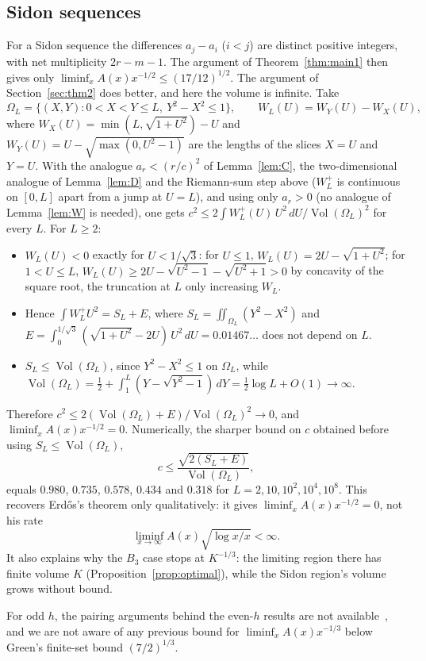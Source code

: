 \documentclass[11pt]{amsart}
\theoremstyle{remark}
\newcommand{\Vol}{\operatorname{Vol}}
\begin{document}
\subsection{Sidon sequences}
For a Sidon sequence the differences $a_j-a_i$ ($i<j$) are distinct positive integers, with net multiplicity $2r-m-1$. The argument of Theorem~\ref{thm:main1} then gives only $\liminf_xA(x)x^{-1/2}\le(17/12)^{1/2}$. The argument of Section~\ref{sec:thm2} does better, and here the volume is infinite. Take
\[
\Omega_L=\{(X,Y):0<X<Y\le L,\ Y^2-X^2\le1\},\qquad W_L(U)=W_Y(U)-W_X(U),
\]
where $W_X(U)=\min(L,\sqrt{1+U^2})-U$ and $W_Y(U)=U-\sqrt{\max(0,U^2-1)}$ are the lengths of the slices $X=U$ and $Y=U$. With the analogue $a_r<(r/c)^2$ of Lemma~\ref{lem:C}, the two-dimensional analogue of Lemma~\ref{lem:D} and the Riemann-sum step above ($W_L^+$ is continuous on $[0,L]$ apart from a jump at $U=L$), and using only $a_r>0$ (no analogue of Lemma~\ref{lem:W} is needed), one gets $c^2\le2\int W_L^+(U)\,U^2\,dU/\Vol(\Omega_L)^2$ for every $L$. For $L\ge2$:
\begin{itemize}
\item $W_L(U)<0$ exactly for $U<1/\sqrt3$: for $U\le1$, $W_L(U)=2U-\sqrt{1+U^2}$; for $1<U\le L$, $W_L(U)\ge2U-\sqrt{U^2-1}-\sqrt{U^2+1}>0$ by concavity of the square root, the truncation at $L$ only increasing $W_L$.
\item Hence $\int W_L^+U^2=S_L+E$, where $S_L=\iint_{\Omega_L}(Y^2-X^2)$ and $E=\int_0^{1/\sqrt3}(\sqrt{1+U^2}-2U)\,U^2\,dU=0.01467\ldots$ does not depend on $L$.
\item $S_L\le\Vol(\Omega_L)$, since $Y^2-X^2\le1$ on $\Omega_L$, while $\Vol(\Omega_L)=\frac12+\int_1^L(Y-\sqrt{Y^2-1})\,dY=\frac12\log L+O(1)\to\infty$.
\end{itemize}
Therefore $c^2\le2(\Vol(\Omega_L)+E)/\Vol(\Omega_L)^2\to0$, and $\liminf_xA(x)x^{-1/2}=0$. Numerically, the sharper bound on $c$ obtained before using $S_L\le\Vol(\Omega_L)$,
\[
c\le\frac{\sqrt{2(S_L+E)}}{\Vol(\Omega_L)},
\]
equals $0.980$, $0.735$, $0.578$, $0.434$ and $0.318$ for $L=2,10,10^2,10^4,10^8$. This recovers Erd\H{o}s's theorem only qualitatively: it gives $\liminf_xA(x)x^{-1/2}=0$, not his rate
\[
\liminf_{x\to\infty}A(x)\sqrt{\log x/x}<\infty.
\]
 It also explains why the $B_3$ case stops at $K^{-1/3}$: the limiting region there has finite volume $K$ (Proposition~\ref{prop:optimal}), while the Sidon region's volume grows without bound.

For odd $h$, the pairing arguments behind the even-$h$ results are not available~\cite{OBryant}, and we are not aware of any previous bound for $\liminf_xA(x)x^{-1/3}$ below Green's finite-set bound $(7/2)^{1/3}$.
\end{document}
